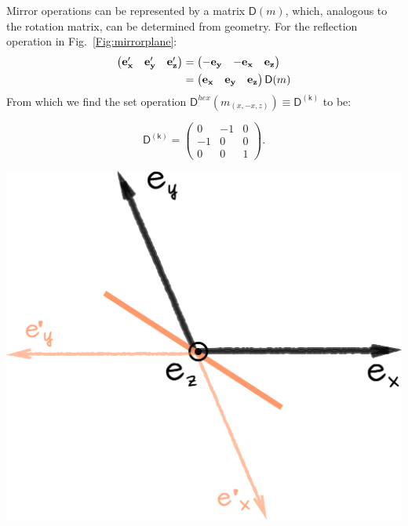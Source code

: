    
\noindent\begin{minipage}{0.57\textwidth}
Mirror operations can be represented by a matrix $\mathsf{D}(m)$, which, analogous to the rotation matrix, can be determined from geometry. For the reflection operation in Fig.~\ref{Fig:mirrorplane}:
\begin{equation*}
\begin{split}
\begin{pmatrix}
\vb{e'_x} & \vb{e'_y} & \vb{e'_z}
\end{pmatrix}
 & =
\begin{pmatrix}
-\vb{e_y} & -\vb{e_x} & \vb{e_z}
\end{pmatrix} \\
&=\begin{pmatrix}
\vb{e_x} & \vb{e_y} & \vb{e_z}
\end{pmatrix}
\mathsf{D}(m)
\end{split}
\end{equation*}
From which we find the set operation $\mathsf{D}^{hex}(m_{(x,-x,z)})\equiv \mathsf{D^{(k)}}$ to be:

\begin{equation}
\mathsf{D^{(k)}} = \begin{pmatrix}
0 & -1 & 0 \\
-1 & 0 & 0 \\
0 & 0 & 1 
\end{pmatrix}.
\label{eq:D_k}
\end{equation}

\end{minipage}
\begin{minipage}{0.4\textwidth}
    \centering
\includegraphics[width=0.9\linewidth]{Figures/mirrorPlane.png}
\captionsetup{width=0.7\linewidth}
\label{Fig:mirrorplane}
\end{minipage}

